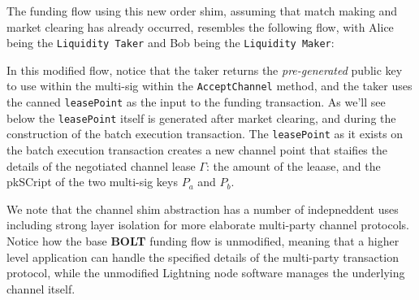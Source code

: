 \documentclass[10pt,a4paper]{article}
\theoremstyle{definition}
\begin{document}
The funding flow using this new order shim, assuming that match making and
market clearing has already occurred, resembles the following flow, with Alice
being the \texttt{Liquidity Taker} and Bob being the \texttt{Liquidity Maker}:
\begin{pcvstack}[boxed,center,space=1em]

\end{pcvstack} 

In this modified flow, notice that the taker returns the \emph{pre-generated}
public key to use within the multi-sig within the \texttt{AcceptChannel}
method, and the taker uses the canned \texttt{leasePoint} as the input to the
funding transaction. As we'll see below the \texttt{leasePoint} itself is
generated after market clearing, and during the construction of the batch
execution transaction. The \texttt{leasePoint} as it exists on the batch
execution transaction creates a new channel point that staifies the details of
the negotiated channel lease $\Gamma$: the amount of the leaase, and the
pkSCript of the two multi-sig keys $P_a$ and $P_b$.

We note that the channel shim abstraction has a number of indepneddent uses
including strong layer isolation for more elaborate multi-party channel
protocols. Notice how the base \textbf{BOLT} funding flow is unmodified,
meaning that a higher level application can handle the specified details of the
multi-party transaction protocol, while the unmodified Lightning node software
manages the underlying channel itself.
\end{document}
